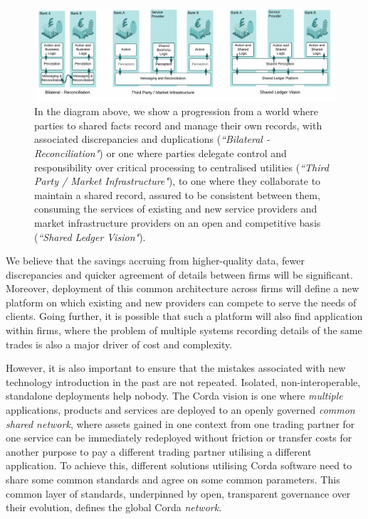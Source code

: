 \documentclass{article}
\begin{document}
\begin{figure}[H]
    \includegraphics[scale=.5, center]{sharedlogic}
    \caption{In the diagram above, we show a progression from a world where parties to shared facts record and manage their own records, with associated discrepancies and duplications (\textit{``Bilateral - Reconciliation"}) or one where parties delegate control and responsibility over critical processing to centralised utilities (\textit{``Third Party / Market Infrastructure"}), to one where they collaborate to maintain a shared record, assured to be consistent between them, consuming the services of existing and new service providers and market infrastructure providers on an open and competitive basis (\textit{``Shared Ledger Vision"}).}
\end{figure}

We believe that the savings accruing from higher-quality data, fewer discrepancies and quicker agreement of details between firms will be significant. Moreover, deployment of this common architecture across firms will define a new platform on which existing and new providers can compete to serve the needs of clients. Going further, it is possible that such a platform will also find application within firms, where the problem of multiple systems recording details of the same trades is also a major driver of cost and complexity.

However, it is also important to ensure that the mistakes associated with new technology introduction in the past are not repeated. Isolated, non-interoperable, standalone deployments help nobody. The Corda vision is one where \textit{multiple} applications, products and services are deployed to an openly governed \textit{common shared network}, where assets gained in one context from one trading partner for one service can be immediately redeployed without friction or transfer costs for another purpose to pay a different trading partner utilising a different application. To achieve this, different solutions utilising Corda software need to share some common standards and agree on some common parameters. This common layer of standards, underpinned by open, transparent governance over their evolution, defines the global Corda \textit{network}.
\end{document}
